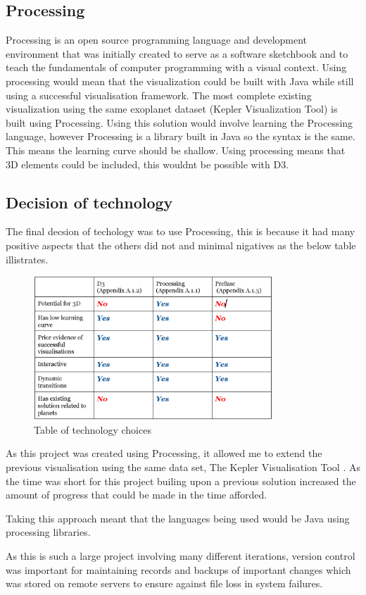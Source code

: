 \subsection{Processing}
Processing is an open source programming language and development environment that was initially created to serve as a software
sketchbook and to teach the fundamentals of computer programming with a visual context.
Using processing would mean that the visualization could be built with Java while still using
a successful visualisation framework. The most complete existing visualization using
the same exoplanet dataset (Kepler Visualization Tool) is built using Processing.
Using this solution would involve learning the Processing language, however Processing
is a library built in Java so the syntax is the same. This means the learning curve should be shallow.
Using processing means that 3D elements could be included, this wouldnt be
possible with D3.

\subsection{Decision of technology}
The final decsion of techology was to use Processing, this is because it had many positive aspects that the others did not and minimal nigatives as the below table illistrates.
\clearpage
\begin{figure}[h!]
  \centering
      \includegraphics[width=0.8\textwidth]{images/table_technologies.jpg}
  \caption{Table of technology choices}
\end{figure}

As this project was created using Processing, it allowed me to extend the previous visualisation using the same data set, The Kepler Visualisation Tool \cite{kepler_github, kepler_article}. As the time was short for this project builing upon a previous solution increased the amount of progress that could be made in the time afforded.

Taking this approach meant that the languages being used would be Java using processing libraries. 

As this is such a large project involving many different iterations, version control was important for maintaining records and backups of important changes which was stored on remote servers to ensure against file loss in system failures.